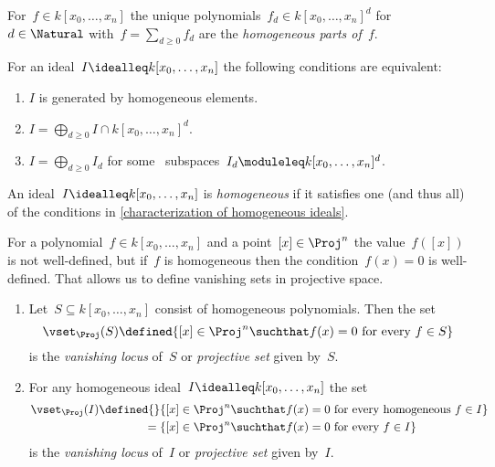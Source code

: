 \begin{definition}
  For~$f \in k[x_0, \dotsc, x_n]$ the unique polynomials~$f_d \in k[x_0, \dotsc, x_n]^d$ for~$d \in \Natural$ with~$f = \sum_{d \geq 0} f_d$ are the \emph{homogeneous parts of~$f$}.
\end{definition}


\begin{lemma}
  \label{characterization of homogeneous ideals}
  For an ideal~$I \idealleq k[x_0, \dotsc, x_n]$ the following conditions are equivalent:
  \begin{enumerate}
    \item
      $I$ is generated by homogeneous elements.
    \item
      $I = \bigoplus_{d \geq 0} I \cap k[x_0, \dotsc, x_n]^d$.
    \item
      $I = \bigoplus_{d \geq 0} I_d$ for some~ subspaces~$I_d \moduleleq k[x_0, \dotsc, x_n]^d$.
  \end{enumerate}
\end{lemma}


\begin{definition}
  An ideal~$I \idealleq k[x_0, \dotsc, x_n]$ is \emph{homogeneous} if it satisfies one (and thus all) of the conditions in \cref{characterization of homogeneous ideals}.
\end{definition}


\begin{fluff}
  For a polynomial~$f \in k[x_0, \dotsc, x_n]$ and a point~$[x] \in \Proj^n$ the value~$f([x])$ is not well-defined, but if~$f$ is homogeneous then the condition~$f(x) = 0$ is well-defined.
  That allows us to define vanishing sets in projective space.
\end{fluff}


\begin{definition}
  \leavevmode
  \begin{enumerate}
    \item
      Let~$S \subseteq k[x_0, \dotsc, x_n]$ consist of homogeneous polynomials.
      Then the set
      \[
                  \vset_{\Proj}(S)
        \defined  \{
                    [x] \in \Proj^n
                  \suchthat
                    \text{$f(x) = 0$ for every~$f \in S$}
                  \}
      \]
      is the \emph{vanishing locus} of~$S$ or \emph{projective set} given by~$S$.
    \item
      For any homogeneous ideal~$I \idealleq k[x_0, \dotsc, x_n]$ the set
      \begin{align*}
                    \vset_{\Proj}(I)
        \defined{}& \{
                      [x] \in \Proj^n
                    \suchthat
                      \text{$f(x) = 0$ for every homogeneous~$f \in I$}
                    \} \\
        ={}&        \{
                      [x] \in \Proj^n
                    \suchthat
                      \text{$f(x) = 0$ for every~$f \in I$}
                    \}
      \end{align*}
      is the \emph{vanishing locus} of~$I$ or \emph{projective set} given by~$I$.
  \end{enumerate}
\end{definition}




